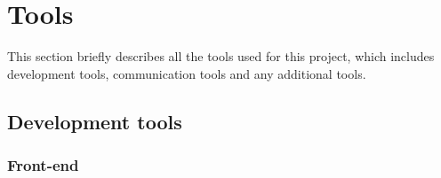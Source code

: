 
\chapter{Tools}

This section briefly describes all the tools used for this project, which includes development tools, communication tools and any additional tools.

\section{Development tools}

\subsection{Front-end}
